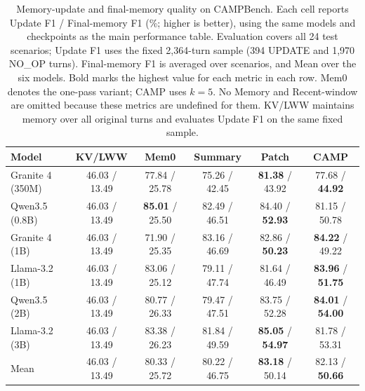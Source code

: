 \begin{table}[t]
\centering
\small
\setlength{\tabcolsep}{6pt}
\begin{tabular}{lccccc}
\toprule
Model & KV/LWW & Mem0 & Summary & Patch & CAMP \\
\midrule
Granite 4 (350M) & 46.03 / 13.49 & 77.84 / 25.78 & 75.26 / 42.45 & \textbf{81.38} / 43.92 & 77.68 / \textbf{44.92} \\
Qwen3.5 (0.8B) & 46.03 / 13.49 & \textbf{85.01} / 25.50 & 82.49 / 46.51 & 84.40 / \textbf{52.93} & 81.15 / 50.78 \\
Granite 4 (1B) & 46.03 / 13.49 & 71.90 / 25.35 & 83.16 / 46.69 & 82.86 / \textbf{50.23} & \textbf{84.22} / 49.22 \\
Llama-3.2 (1B) & 46.03 / 13.49 & 83.06 / 25.12 & 79.11 / 47.74 & 81.64 / 46.49 & \textbf{83.96} / \textbf{51.75} \\
Qwen3.5 (2B) & 46.03 / 13.49 & 80.77 / 26.33 & 79.47 / 47.51 & 83.75 / 52.28 & \textbf{84.01} / \textbf{54.00} \\
Llama-3.2 (3B) & 46.03 / 13.49 & 83.38 / 26.23 & 81.84 / 49.59 & \textbf{85.05} / \textbf{54.97} & 81.78 / 53.31 \\
\midrule
Mean & 46.03 / 13.49 & 80.33 / 25.72 & 80.22 / 46.75 & \textbf{83.18} / 50.14 & 82.13 / \textbf{50.66} \\
\bottomrule
\end{tabular}
\caption{Memory-update and final-memory quality on CAMPBench. Each cell reports Update F1 / Final-memory F1 (\%; higher is better), using the same models and checkpoints as the main performance table. Evaluation covers all 24 test scenarios; Update F1 uses the fixed 2,364-turn sample (394 UPDATE and 1,970 NO\_OP turns). Final-memory F1 is averaged over scenarios, and Mean over the six models. Bold marks the highest value for each metric in each row. Mem0 denotes the one-pass variant; CAMP uses $k=5$. No Memory and Recent-window are omitted because these metrics are undefined for them. KV/LWW maintains memory over all original turns and evaluates Update F1 on the same fixed sample.}
\label{tab:appendix-memory-metrics}
\end{table}
